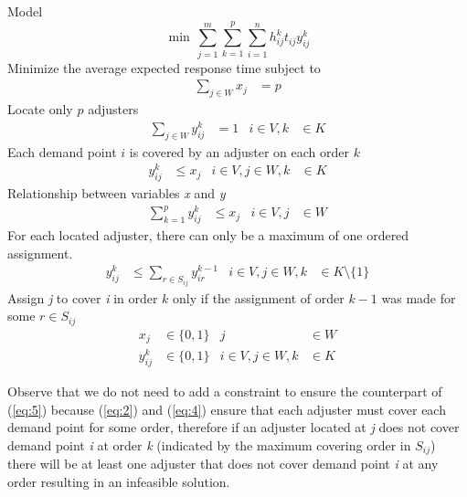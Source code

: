 Model
{\small
  \begin{equation}
    \min \, \sum_{j=1}^{m}{
      \sum_{k=1}^{p}{
        \sum_{i=1}^{n}{
          h_{ij}^{k}t_{ij}y_{ij}^{k}
        }
      }
    }
  \end{equation}
}
Minimize the average expected response time
subject to
\begin{align}
  \label{eq:2}
  \sum_{j \in W}{x_j}
  & = p
\end{align}
Locate only $p$ adjusters
\begin{align}
  \label{eq:3}
  \sum_{j \in W}{y_{ij}^{k}}
  & = 1
  & i \in V, k
  &\in K
\end{align}
Each demand point $i$ is covered by an adjuster on each order $k$
\begin{align}
  \label{eq:4}
  y_{ij}^{k}
  & \leq x_j
  & i \in V,j \in W, k
  &\in K
\end{align}
Relationship between variables \textit{x} and \textit{y}
\begin{align}
  \label{eq:5}
  \sum_{k = 1}^{p}{
    y_{ij}^{k}
  }
  & \leq x_j
  & i \in V, j 
  & \in W
\end{align}
For each located adjuster,
there can only be
a maximum of one ordered assignment.
\begin{align}
  y_{ij}^{k} 
  & \leq \sum_{r\in S_{ij}}{y_{ir}^{k-1}}
  & i \in V,j \in W, k
  & \in K\setminus\{1\}
\end{align}
Assign \textit{j} to cover \textit{i} in order $k$
only if
the assignment of order $k-1$
was made for some $r \in S_{ij}$
\begin{align}
  x_{j}
  & \in \{0,1\}
  & j 
  & \in W \nonumber
  \\
  y_{ij}^{k}
  & \in \{0,1\}
  &  i \in V,j \in W,k
  &\in K \nonumber
\end{align}

Observe that
we do not need
to add a constraint
to ensure
the counterpart of (\ref{eq:5})
because (\ref{eq:2}) and (\ref{eq:4})
ensure that
each adjuster
must cover each demand point
for some order,
therefore
if an adjuster located at \textit{j}
does not cover demand point \textit{i}
at order \textit{k}
(indicated by
the maximum covering order in $S_{ij}$)
there will be at least
one adjuster
that does not cover
demand point \textit{i}
at any order
resulting in an infeasible solution.
